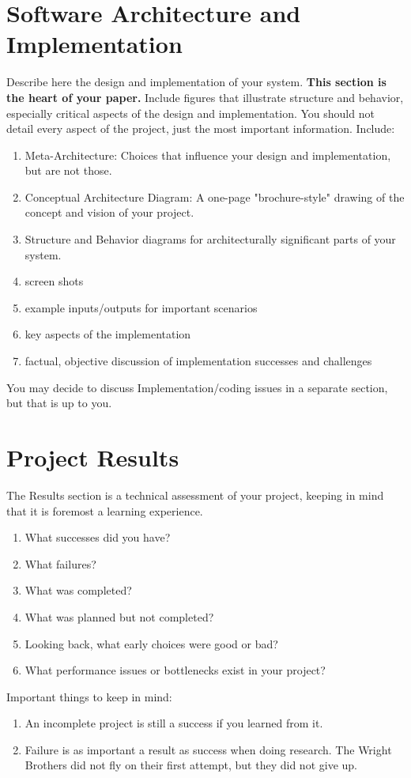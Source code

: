\documentclass[acmlarge,screen]{acmart}
\begin{document}
\section{Software Architecture and Implementation}
Describe here the design and implementation of your system. \textbf{This section is the heart of your paper.} Include figures that illustrate structure and behavior, especially critical aspects of the design and implementation. You should not detail every aspect of the project, just the most important information. Include:
\begin{enumerate}
    \item Meta-Architecture: Choices that influence your design and implementation, but are not those.
    \item Conceptual Architecture Diagram: A one-page "brochure-style" drawing of the concept and vision of your project.
    \item Structure and Behavior diagrams for architecturally significant parts of your system.
    \item screen shots
    \item example inputs/outputs for important scenarios
    \item key aspects of the implementation
    \item factual, objective discussion of implementation successes and challenges
\end{enumerate}
You may decide to discuss Implementation/coding issues in a separate section, but that is up to you.

\section{Project Results}
The Results section is a technical assessment of your project, keeping in mind that it is foremost a learning experience.
\begin{enumerate}
    \item What successes did you have?
    \item What failures?
    \item What was completed?
    \item What was planned but not completed?
    \item Looking back, what early choices were good or bad?
    \item What performance issues or bottlenecks exist in your project?
\end{enumerate}
Important things to keep in mind:
\begin{enumerate}
    \item An incomplete project is still a success if you learned from it.
    \item Failure is as important a result as success when doing research. The Wright Brothers did not fly 
    on their first attempt, but they did not give up.
\end{enumerate}
\end{document}

